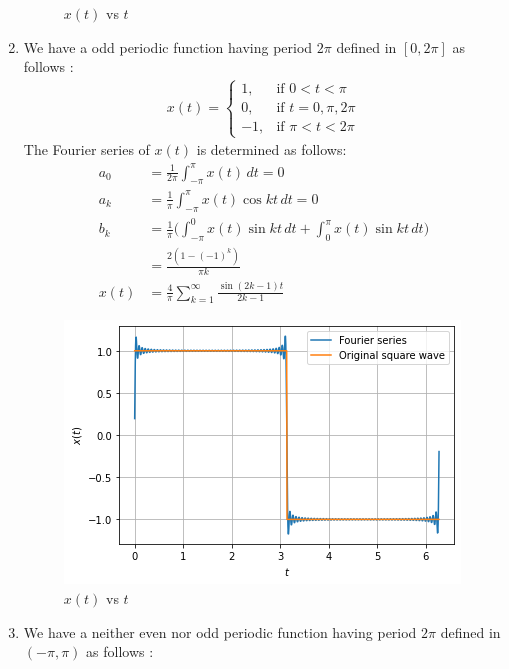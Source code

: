 \begin{enumerate}
\begin{figure}[!ht]
    \caption{$x(t)$ vs $t$}
    \label{ec/1998/1/4/Fourier series of x(t)1}
\end{figure}
\item We have a odd periodic function having period $2\pi$ defined in $[0,2\pi]$ as follows :
\begin{align}
x(t)=  
\begin{cases}
1, & \text{if } 0 < t < \pi\\
0, & \text{if } t = 0,\pi,2\pi\\
-1, & \text{if } \pi < t < 2\pi \nonumber
\end{cases}
\end{align}
The Fourier series of $x(t)$ is determined as follows:
\begin{align}
a_{0} &=\frac{1}{2\pi}{\int_{-\pi}^{\pi}x(t)\, dt}=0 \nonumber \\
a_{k} &= \frac{1}{\pi}{\int_{-\pi}^{\pi}x(t)\cos{kt}\, dt} = 0\nonumber \\
b_{k} &= \frac{1}{\pi}\Bigg({\int_{-\pi}^{0}x(t)\sin{kt}\, dt}+{\int_{0}^{\pi}x(t)\sin{kt}\, dt}\Bigg) \nonumber \\
&= \frac{2(1-(-1)^{k})}{\pi k}\nonumber \\
x(t) &= \frac{4}{\pi}\sum_{k=1}^{\infty}\frac{\sin{(2k-1)t}}{2k-1}
\end{align}
\begin{figure}[!ht]
    \centering
    \includegraphics[width=\columnwidth] {solutions/ec/1998/1/4/Figures/Gate_Assignment_4_Fig_2.png}
    \caption{$x(t)$ vs $t$}
    \label{ec/1998/1/4/Fourier series of x(t)2}
\end{figure}
\item We have a neither even nor odd periodic function having period $2\pi$ defined in $(-\pi,\pi)$ as follows :

\end{enumerate}
